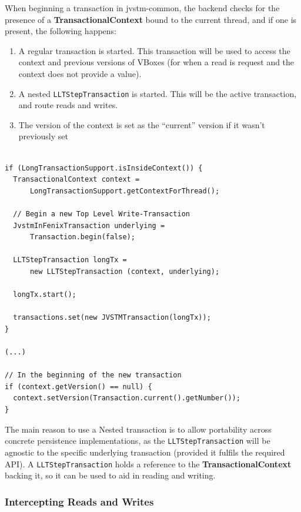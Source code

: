 When beginning a transaction in jvstm-common, the backend checks for
the presence of a {\bf TransactionalContext} bound to the current
thread, and if one is present, the following happens:

\begin{enumerate}

\item A regular transaction is started. This transaction will be used
  to access the context and previous versions of VBoxes (for when a
  read is request and the context does not provide a value).

\item A nested \texttt{LLTStepTransaction} is started. This will be the
  active transaction, and route reads and writes.

\item The version of the context is set as the ``current'' version if
  it wasn't previously set

\end{enumerate}

\begin{lstlisting}[caption={Beginning a new Long Lived Transaction
    step}]

if (LongTransactionSupport.isInsideContext()) {
  TransactionalContext context = 
      LongTransactionSupport.getContextForThread();

  // Begin a new Top Level Write-Transaction
  JvstmInFenixTransaction underlying =
      Transaction.begin(false);

  LLTStepTransaction longTx = 
      new LLTStepTransaction (context, underlying);

  longTx.start();

  transactions.set(new JVSTMTransaction(longTx));
}

(...)

// In the beginning of the new transaction
if (context.getVersion() == null) {
  context.setVersion(Transaction.current().getNumber());
}
\end{lstlisting}

The main reason to use a Nested transaction is to allow portability
across concrete persistence implementations, as the
\texttt{LLTStepTransaction} will be agnostic to the specific
underlying transaction (provided it fulfils the required API). A
\texttt{LLTStepTransaction} holds a reference to the {\bf
  TransactionalContext} backing it, so it can be used to aid in
reading and writing.

\subsubsection{Intercepting Reads and Writes}

